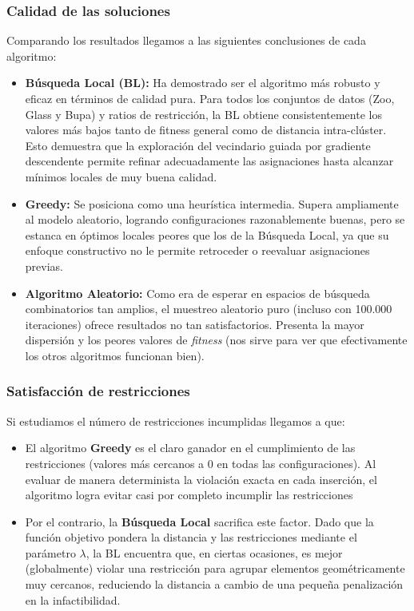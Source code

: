 \documentclass[12pt]{article}
\begin{document}
    \subsubsection{Calidad de las soluciones}
    Comparando los resultados llegamos a las siguientes conclusiones de cada algoritmo:
    
    \begin{itemize}
        \item \textbf{Búsqueda Local (BL):} Ha demostrado ser el algoritmo más robusto y eficaz en términos de calidad pura. Para todos los conjuntos de datos (Zoo, Glass y Bupa) y ratios de restricción, la BL obtiene consistentemente los valores más bajos tanto de fitness general como de distancia intra-clúster. Esto demuestra que la exploración del vecindario guiada por gradiente descendente permite refinar adecuadamente las asignaciones hasta alcanzar mínimos locales de muy buena calidad.
        \item \textbf{Greedy:} Se posiciona como una heurística intermedia. Supera ampliamente al modelo aleatorio, logrando configuraciones razonablemente buenas, pero se estanca en óptimos locales peores que los de la Búsqueda Local, ya que su enfoque constructivo no le permite retroceder o reevaluar asignaciones previas.
        \item \textbf{Algoritmo Aleatorio:} Como era de esperar en espacios de búsqueda combinatorios tan amplios, el muestreo aleatorio puro (incluso con 100.000 iteraciones) ofrece resultados no tan satisfactorios. Presenta la mayor dispersión y los peores valores de \textit{fitness} (nos sirve para ver que efectivamente los otros algoritmos funcionan bien).
    \end{itemize}

    \subsubsection{Satisfacción de restricciones}
    Si estudiamos el número de restricciones incumplidas llegamos a que:
    
    \begin{itemize}
        \item El algoritmo \textbf{Greedy} es el claro ganador en el cumplimiento de las restricciones (valores más cercanos a 0 en todas las configuraciones). Al evaluar de manera determinista la violación exacta en cada inserción, el algoritmo logra evitar casi por completo incumplir las restricciones
        \item Por el contrario, la \textbf{Búsqueda Local} sacrifica este factor. Dado que la función objetivo pondera la distancia y las restricciones mediante el parámetro $\lambda$, la BL encuentra que, en ciertas ocasiones, es mejor (globalmente) violar una restricción para agrupar elementos geométricamente muy cercanos, reduciendo la distancia a cambio de una pequeña penalización en la infactibilidad.
    \end{itemize}
\end{document}
